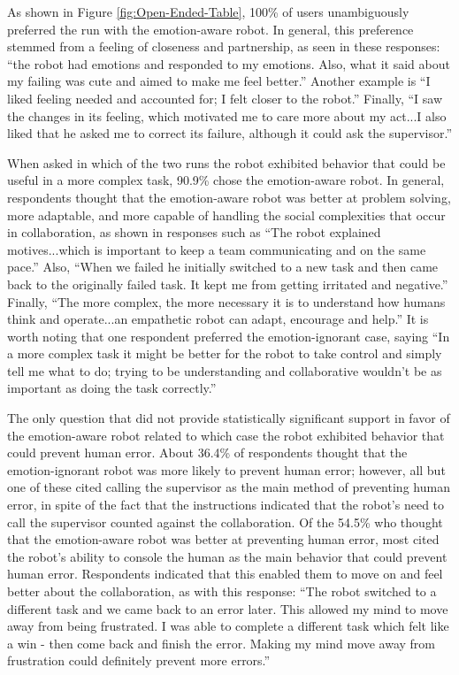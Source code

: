 \documentclass[12pt]{report}
\begin{document}
As shown in Figure \ref{fig:Open-Ended-Table}, 100\% of users unambiguously
preferred the run with the emotion-aware robot. In general, this preference
stemmed from a feeling of closeness and partnership, as seen in these responses:
``the robot had emotions and responded to my emotions. Also, what it said about
my failing was cute and aimed to make me feel better.'' Another example is ``I
liked feeling needed and accounted for; I felt closer to the robot.'' Finally,
``I saw the changes in its feeling, which motivated me to care more about my
act...I also liked that he asked me to correct its failure, although it could
ask the supervisor.''  

When asked in which of the two runs the robot exhibited
behavior that could be useful in a more complex task, 90.9\% chose the
emotion-aware robot. In general, respondents thought that the emotion-aware
robot was better at problem solving, more adaptable, and more capable of
handling the social complexities that occur in collaboration, as shown in
responses such as ``The robot explained motives...which is important to keep a
team communicating and on the same pace.'' Also, ``When we failed he initially
switched to a new task and then came back to the originally failed task. It kept
me from getting irritated and negative.'' Finally, ``The more complex, the more
necessary it is to understand how humans think and operate...an empathetic robot
can adapt, encourage and help.'' It is worth noting that one respondent
preferred the emotion-ignorant case, saying ``In a more complex task it might be
better for the robot to take control and simply tell me what to do; trying to be
understanding and collaborative wouldn't be as important as doing the task
correctly.''

The only question that did not provide statistically significant support in
favor of the emotion-aware robot related to which case the robot exhibited
behavior that could prevent human error. About 36.4\% of respondents thought
that the emotion-ignorant robot was more likely to prevent human error; however, all
but one of these cited calling the supervisor as the main method of preventing
human error, in spite of the fact that the instructions indicated that the
robot's need to call the supervisor counted against the collaboration. Of the
54.5\% who thought that the emotion-aware robot was better at preventing human
error, most cited the robot's ability to console the human as the main behavior
that could prevent human error. Respondents indicated that this enabled them to
move on and feel better about the collaboration, as with this response: ``The
robot switched to a different task and we came back to an error later. This
allowed my mind to move away from being frustrated. I was able to complete a
different task which felt like a win - then come back and finish the error.
Making my mind move away from frustration could definitely prevent more
errors.''
\end{document}
